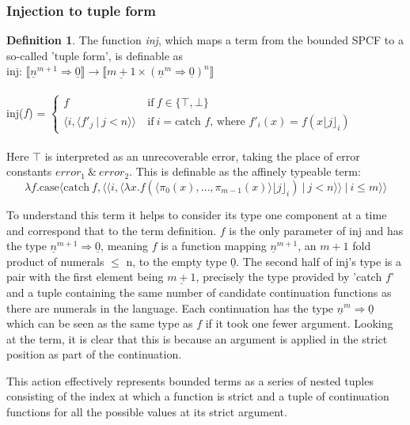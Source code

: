 \documentclass[12pt,a4paper]{report}
\theoremstyle{definition}
\theoremstyle{definition}
\newtheorem{definition}{Definition}[chapter]%
\theoremstyle{remark}
\begin{document}
\subsubsection{Injection to tuple form}
\begin{definition}\label{def:inj}
    The function \emph{inj}, which maps a term from the bounded SPCF to a so-called 'tuple form', is definable as \\
    inj: $\llbracket \underline{n}^{m+1} \Rightarrow \underline{0} \rrbracket \rightarrow \llbracket \underline{m + 1} \times (\underline{n}^{m} \Rightarrow \underline{0})^n \rrbracket$\\\\
    inj($f$) =
    $\begin{cases}
        f &\text{if}\ f \in \{\top, \bot\}\\
        \langle i, \langle f'_j\ |\ j < n \rangle \rangle\ &\text{if}\ i = \text{catch } f  \text{, where } f'_i(x) =  f(x \lfloor j \rfloor_i)
    \end{cases}$\\\\
    Here $\top$ is interpreted as an unrecoverable error, taking the place of error constants $error_1\ \&\ error_2$. 
    This is definable as the affinely typeable term:
    \[
    \lambda f.\text{case}\langle \text{catch}\ f, \langle \langle i, \langle \lambda x.f(\langle \pi_0(x),\dots,\pi_{m-1}(x)\rangle \lfloor j \rfloor_i)\ |\ j < n  \rangle \rangle\ |\ i \leq m \rangle \rangle
    \]
\end{definition}

To understand this term it helps to consider its type one component at a time and correspond that to the term definition. $f$ is the only parameter of inj and has the type $\underline{n}^{m+1} \Rightarrow \underline{0}$, meaning $f$ is a function mapping $\underline{n}^{m+1}$, an $m+1$ fold product of numerals $\le$ n, to the empty type $\underline{0}$.  The second half of inj's type is a pair with the first element being $\underline{m+1}$, precisely the type provided by 'catch $f$' and a tuple containing the same number of candidate continuation functions as there are numerals in the language. Each continuation has the type $\underline{n}^{m} \Rightarrow \underline{0}$ which can be seen as the same type as $f$ if it took one fewer argument. Looking at the term, it is clear that this is because an argument is applied in the strict position as part of the continuation. 

This action effectively represents bounded terms as a series of nested tuples consisting of the index at which a function is strict and a tuple of continuation functions for all the possible values at its strict argument. 
\end{document}
